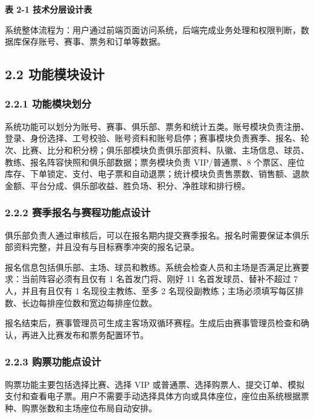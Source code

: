 \documentclass[UTF8,zihao=-4,a4paper]{ctexart}
\newcommand{\tablecaptionline}[1]{\vspace{-1.6em}\begin{center}\small\bfseries #1\end{center}\vspace{0.2em}}
\begin{document}
\tablecaptionline{表 2-1 技术分层设计表}

系统整体流程为：用户通过前端页面访问系统，后端完成业务处理和权限判断，数据库保存账号、赛事、票务和订单等数据。

\subsection*{2.2 功能模块设计}
{}

\subsubsection*{2.2.1 功能模块划分}
{}

系统功能可以划分为账号、赛事、俱乐部、票务和统计五类。账号模块负责注册、登录、身份选择、工号校验、账号资料和账号启停；赛事模块负责赛季、报名、轮次、比赛、比分和积分榜；俱乐部模块负责俱乐部资料、队徽、主场信息、球员、教练、报名阵容快照和俱乐部数据；票务模块负责 VIP/普通票、8 个票区、座位库存、下单锁定、支付、电子票和自动退票；统计模块负责售票数、销售额、退款金额、平台分成、俱乐部收益、胜负场、积分、净胜球和排行榜。

\subsubsection*{2.2.2 赛季报名与赛程功能点设计}
{}

俱乐部负责人通过审核后，可以在报名期内提交赛季报名。报名时需要保证本俱乐部资料完整，并且没有与目标赛季冲突的报名记录。

报名信息包括俱乐部、主场、球员和教练。系统会检查人员和主场是否满足比赛要求：当前阵容必须有且仅有 1 名首发门将、刚好 11 名首发球员、替补不超过 7 人，并且有且仅有 1 名现役主教练、至多 2 名现役副教练；主场必须填写每区排数、长边每排座位数和宽边每排座位数。

报名结束后，赛事管理员可生成主客场双循环赛程。生成后由赛事管理员检查和确认，再进入比赛发布和票务配置环节。

\subsubsection*{2.2.3 购票功能点设计}
{}

购票功能主要包括选择比赛、选择 VIP 或普通票、选择购票人、提交订单、模拟支付和查看电子票。用户不需要手动选择具体方向或具体座位，座位由系统根据票种、购票张数和主场座位布局自动安排。
\end{document}
